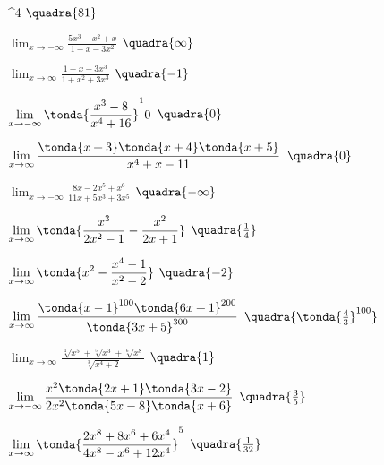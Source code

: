 \begin{esercizio}
\begin{multicols}{2}
\begin{enumeratea}
          ^4\)
  \hfill \(\quadra{81}\)
  \item \(\displaystyle \lim_{x \rightarrow -\infty} 
          \frac{5x^3-x^2+x}{1-x-3x^2}\)
  \hfill \(\quadra{\infty}\)
  \item \(\displaystyle \lim_{x \rightarrow \infty} 
          \frac{1+x-3x^3}{1+x^2+3x^3}\)
  \hfill \(\quadra{-1}\)
  \item \(\displaystyle \lim_{x \rightarrow -\infty} 
          \tonda{\frac{x^3-8}{x^4+16}}^10\)
  \hfill \(\quadra{0}\)
  \item \(\displaystyle \lim_{x \rightarrow \infty} 
          \frac{\tonda{x+3}\tonda{x+4}\tonda{x+5}}{x^4+x-11}\)
  \hfill \(\quadra{0}\)
  \item \(\displaystyle \lim_{x \rightarrow -\infty} 
          \frac{8x-2x^5+x^6}{11x+5x^3+3x^5}\)
  \hfill \(\quadra{-\infty}\)
  \item \(\displaystyle \lim_{x \rightarrow \infty} 
          \tonda{\frac{x^3}{2x^2-1}-\frac{x^2}{2x+1}}\)
  \hfill \(\quadra{\frac{1}{4}}\)
  \item \(\displaystyle \lim_{x \rightarrow \infty} 
          \tonda{x^2-\frac{x^4-1}{x^2-2}}\)
  \hfill \(\quadra{-2}\)
  \item \(\displaystyle \lim_{x \rightarrow \infty} 
          \frac{\tonda{x-1}^{100}\tonda{6x+1}^{200}}{\tonda{3x+5}^{300}}\)
  \hfill \(\quadra{\tonda{\frac{4}{3}}^{100}}\)
  \item \(\displaystyle \lim_{x \rightarrow \infty} 
          \frac{\sqrt[4]{x^5}+\sqrt[5]{x^3}+\sqrt[6]{x^8}}
               {\sqrt[3]{x^4+2}}\)
  \hfill \(\quadra{1}\)
  \item \(\displaystyle \lim_{x \rightarrow -\infty} 
          \frac{x^2\tonda{2x+1}\tonda{3x-2}}
               {2x^2\tonda{5x-8}\tonda{x+6}}\)
  \hfill \(\quadra{\frac{3}{5}}\)
  \item \(\displaystyle \lim_{x \rightarrow \infty} 
          \tonda{\frac{2x^8+8x^6+6x^4}{4x^8-x^6+12x^4}}^5\)
  \hfill \(\quadra{\frac{1}{32}}\)
 \end{enumeratea}
 \end{multicols}
\end{esercizio}

